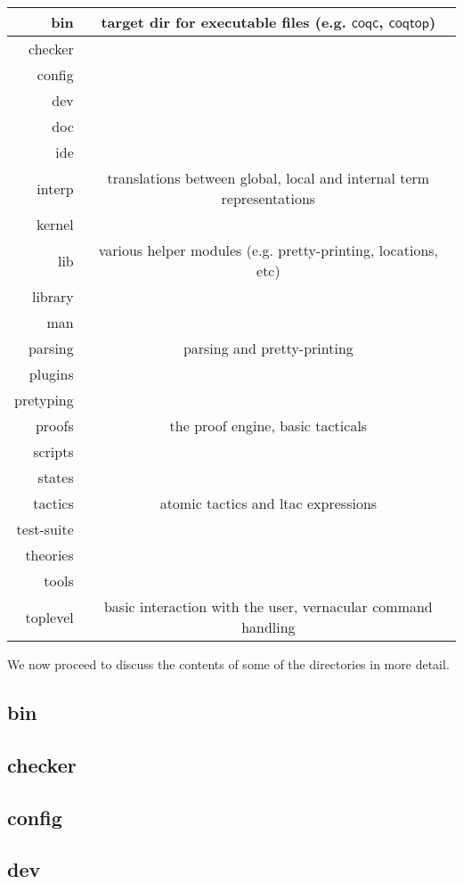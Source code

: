 \documentclass[a4paper,oneside]{book}
\newcommand{\m}[1]{\ensuremath{\mathsf{#1}}}
\begin{document}
\begin{tabular}{|r|c|}
\hline
bin & target dir for executable files (e.g. \m{coqc}, \m{coqtop}) \\ \hline
checker & \\ \hline
config & \\ \hline
dev & \\ \hline
doc & \\ \hline
ide & \\ \hline
interp & translations between global, local and internal term representations 
\\ \hline
kernel & \\ \hline
lib & various helper modules (e.g. pretty-printing, locations, etc)
\\ \hline
library & \\ \hline
man & \\ \hline
parsing & parsing and pretty-printing \\ \hline
plugins & \\ \hline
pretyping & \\ \hline
proofs & the proof engine, basic tacticals \\ \hline
scripts & \\ \hline
states & \\ \hline
tactics & atomic tactics and ltac expressions\\ \hline
test-suite & \\ \hline
theories & \\ \hline
tools & \\ \hline
toplevel & basic interaction with the user, vernacular command handling
\\ \hline
\end{tabular}

We now proceed to discuss the contents of some of the directories in
more detail.

\subsection{bin}
\subsection{checker}
\subsection{config}
\subsection{dev}
\end{document}
